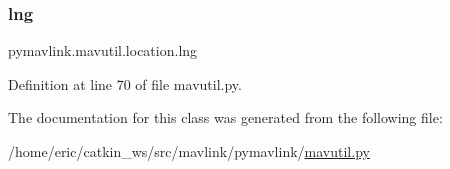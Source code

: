 \mbox{\label{classpymavlink_1_1mavutil_1_1location_a6226c212e18f9de2b4f8291952dd58df}} 
\subsubsection{\texorpdfstring{lng}{lng}}
{\footnotesize\ttfamily pymavlink.\+mavutil.\+location.\+lng}



Definition at line 70 of file mavutil.\+py.



The documentation for this class was generated from the following file\+:\begin{DoxyCompactItemize}
\item 
/home/eric/catkin\+\_\+ws/src/mavlink/pymavlink/\mbox{\hyperlink{mavutil_8py}{mavutil.\+py}}\end{DoxyCompactItemize}
